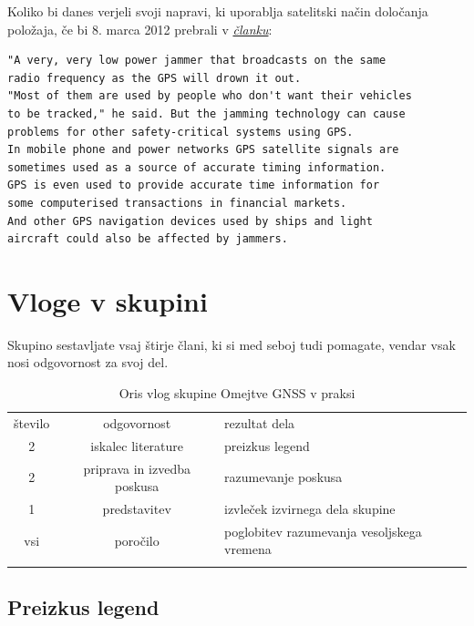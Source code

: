 Koliko bi danes verjeli svoji napravi, ki uporablja satelitski način določanja položaja, če bi 8. marca 2012 prebrali v \href{http://www.bbc.com/news/technology-17119768}{\textit{članku}}:
\begin{verbatim}
"A very, very low power jammer that broadcasts on the same 
radio frequency as the GPS will drown it out.
"Most of them are used by people who don't want their vehicles 
to be tracked," he said. But the jamming technology can cause 
problems for other safety-critical systems using GPS. 
In mobile phone and power networks GPS satellite signals are 
sometimes used as a source of accurate timing information.
GPS is even used to provide accurate time information for 
some computerised transactions in financial markets. 
And other GPS navigation devices used by ships and light 
aircraft could also be affected by jammers.
\end{verbatim}

\section{Vloge v skupini}
\label{sec:Gnss_Vloge}
Skupino sestavljate vsaj štirje člani, ki si med seboj tudi pomagate, vendar vsak nosi odgovornost za svoj del.

\begin{table}
	\centering
	\caption{Oris vlog skupine Omejtve GNSS v praksi}
	\label{tab:GnssVloge} 
	\begin{tabular}{c|c|l}
		\hline\noalign{\bigskip}
		število & odgovornost                 & rezultat dela \\
		\noalign{\smallskip}\hline\noalign{\smallskip}
		2       & iskalec literature          & preizkus legend\\
		2       & priprava in izvedba poskusa & razumevanje poskusa \\
		1       & predstavitev                & izvleček izvirnega dela skupine \\ \hline
		vsi     & poročilo                    & poglobitev razumevanja vesoljskega vremena\\
		\noalign{\smallskip}\hline
	\end{tabular}
\end{table}

\subsection{Preizkus legend}
\label{subsec:GnssPrak_LitPreizkusLegend}

